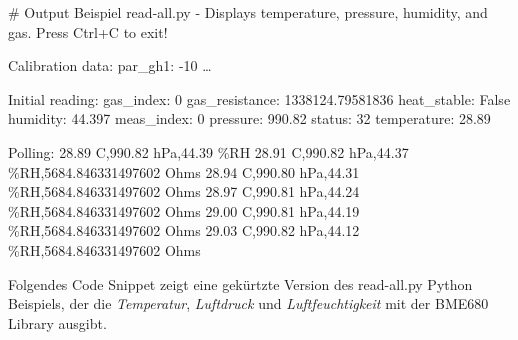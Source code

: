 \documentclass[
  11pt,
  a4paper,
  oneside, openany  ,captions=tableheading
]{scrbook}
\newenvironment{Shaded}{\begin{snugshade}}{\end{snugshade}}
\newcommand{\AttributeTok}[1]{\textcolor[rgb]{0.40,0.45,0.13}{#1}}
\newcommand{\CommentTok}[1]{\textcolor[rgb]{0.37,0.37,0.37}{#1}}
\newcommand{\ExtensionTok}[1]{\textcolor[rgb]{0.00,0.23,0.31}{#1}}
\newcommand{\NormalTok}[1]{\textcolor[rgb]{0.00,0.23,0.31}{#1}}
\theoremstyle{remark}
\begin{document}
\begin{Shaded}
\begin{Highlighting}[]
\CommentTok{\# Output Beispiel}
\ExtensionTok{read{-}all.py} \AttributeTok{{-}}\NormalTok{ Displays temperature, pressure, humidity, and gas.}
\ExtensionTok{Press}\NormalTok{ Ctrl+C to exit!}

\ExtensionTok{Calibration}\NormalTok{ data:}
\ExtensionTok{par\_gh1:} \AttributeTok{{-}10}
\ExtensionTok{…}

\ExtensionTok{Initial}\NormalTok{ reading:}
\ExtensionTok{gas\_index:}\NormalTok{ 0}
\ExtensionTok{gas\_resistance:}\NormalTok{ 1338124.79581836}
\ExtensionTok{heat\_stable:}\NormalTok{ False}
\ExtensionTok{humidity:}\NormalTok{ 44.397}
\ExtensionTok{meas\_index:}\NormalTok{ 0}
\ExtensionTok{pressure:}\NormalTok{ 990.82}
\ExtensionTok{status:}\NormalTok{ 32}
\ExtensionTok{temperature:}\NormalTok{ 28.89}

\ExtensionTok{Polling:}
\ExtensionTok{28.89}\NormalTok{ C,990.82 hPa,44.39 \%RH}
\ExtensionTok{28.91}\NormalTok{ C,990.82 hPa,44.37 \%RH,5684.846331497602 Ohms}
\ExtensionTok{28.94}\NormalTok{ C,990.80 hPa,44.31 \%RH,5684.846331497602 Ohms}
\ExtensionTok{28.97}\NormalTok{ C,990.81 hPa,44.24 \%RH,5684.846331497602 Ohms}
\ExtensionTok{29.00}\NormalTok{ C,990.81 hPa,44.19 \%RH,5684.846331497602 Ohms}
\ExtensionTok{29.03}\NormalTok{ C,990.82 hPa,44.12 \%RH,5684.846331497602 Ohms}
\end{Highlighting}
\end{Shaded}

Folgendes Code Snippet zeigt eine gekürtzte Version des read-all.py
Python Beispiels, der die \emph{Temperatur}, \emph{Luftdruck} und
\emph{Luftfeuchtigkeit} mit der BME680 Library ausgibt.
\end{document}
